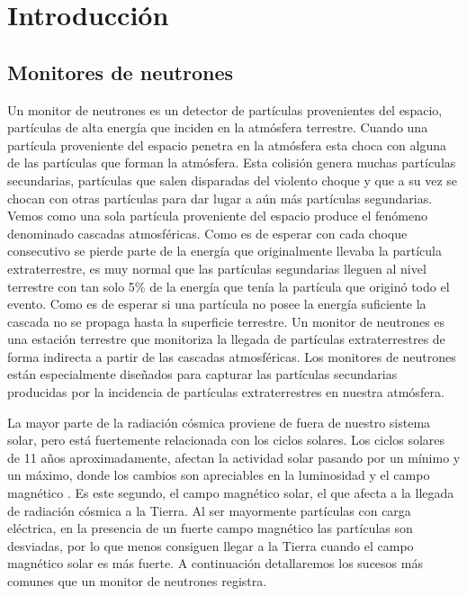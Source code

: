 \chapter{Introducción}
\label{cap1}

\section{Monitores de neutrones}
	Un monitor de neutrones es un detector de partículas provenientes del espacio, partículas de alta energía que inciden en la atmósfera terrestre. 
	Cuando una partícula proveniente del espacio penetra en la atmósfera esta choca con alguna de las partículas que forman la atmósfera. 
	Esta colisión genera muchas partículas secundarias, partículas que salen disparadas del violento choque y que a su vez 
	se chocan con otras partículas para dar lugar a aún más partículas segundarias. Vemos como una sola partícula proveniente del espacio produce el fenómeno 
	denominado cascadas atmosféricas. Como es de esperar con cada choque consecutivo se pierde parte de la energía que originalmente llevaba la 
	partícula extraterrestre, es muy normal que las partículas segundarias lleguen al nivel terrestre con tan solo 5\% de la energía que tenía la 
	partícula que originó todo el evento. Como es de esperar si una partícula no posee la energía suficiente la cascada no se propaga hasta la 
	superficie terrestre. Un monitor de neutrones es una estación terrestre que monitoriza la llegada de partículas extraterrestres de forma 
	indirecta a partir de las cascadas atmosféricas. Los monitores de neutrones están especialmente diseñados para capturar las partículas 
	secundarias producidas por la incidencia de partículas extraterrestres en nuestra atmósfera.
	\par
	La mayor parte de la radiación cósmica proviene de fuera de nuestro sistema solar, pero está fuertemente relacionada con 
	los ciclos solares. Los ciclos solares de 11 años aproximadamente, afectan la actividad solar pasando por un mínimo y un máximo, donde los
	cambios son apreciables en la luminosidad y el campo magnético \cite{SolarCicleWiki}. Es este segundo, el campo magnético solar, el que afecta a la llegada de 
	radiación cósmica a la Tierra. Al ser mayormente partículas con carga eléctrica, en la presencia de un fuerte campo magnético las partículas
	son desviadas, por lo que menos consiguen llegar a la Tierra cuando el campo magnético solar es más fuerte. A continuación detallaremos los
	sucesos más comunes que un monitor de neutrones registra. 
